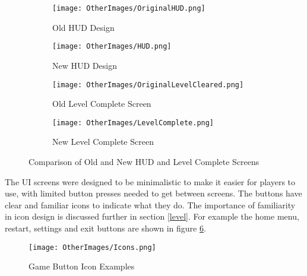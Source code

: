 \documentclass[10pt]{final_report}
\begin{document}
\begin{figure}[H]
    \centering
    \begin{subfigure}{0.45\textwidth}
        \centering
        \texttt{[image: OtherImages/OriginalHUD.png]}
        \caption{Old HUD Design}
        \label{fig:old_hud}
    \end{subfigure}
    \hfill
    \begin{subfigure}{0.45\textwidth}
        \centering
        \texttt{[image: OtherImages/HUD.png]}
        \caption{New HUD Design}
        \label{fig:new_hud}
    \end{subfigure}
    
    \vspace{1em} %

    \begin{subfigure}{0.45\textwidth}
        \centering
        \texttt{[image: OtherImages/OriginalLevelCleared.png]}
        \caption{Old Level Complete Screen}
        \label{fig:old_complete}
    \end{subfigure}
    \hfill
    \begin{subfigure}{0.45\textwidth}
        \centering
        \texttt{[image: OtherImages/LevelComplete.png]}
        \caption{New Level Complete Screen}
        \label{fig:new_complete}
    \end{subfigure}

    \caption{Comparison of Old and New HUD and Level Complete Screens}
    \label{fig:hud_comparison}
\end{figure}
The UI screens were designed to be minimalistic to make it easier for players to use, with limited button presses needed to get between screens. The buttons have clear and familiar icons to indicate what they do. The importance of familiarity in icon design is discussed further in section \ref{level}. For example the home menu, restart, settings and exit buttons are shown in figure \ref{fig:label_icons}. 

\begin{figure}[H]
    \centering
    \texttt{[image: OtherImages/Icons.png]}
    \caption{Game Button Icon Examples}
    \label{fig:label_icons}
\end{figure}
\end{document}
